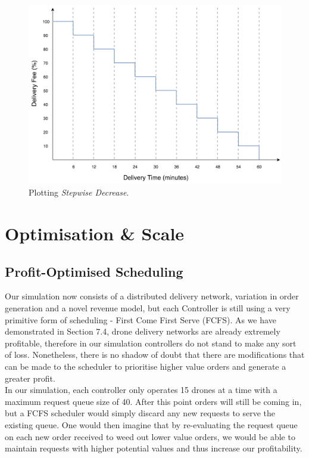 \documentclass[a4paper,11pt,titlepage]{report}
\begin{document}
\begin{figure}[!hbpt]
  \center
  \includegraphics[width=\linewidth]{img/tvfs_decrease.png}
  \caption{Plotting \textit{Stepwise Decrease}.}
  \label{fig:tvfs_decrease}
\end{figure}

\newpage
\part{Optimisation \& Scale}
\chapter{Profit-Optimised Scheduling}
Our simulation now consists of a distributed delivery network, variation in order generation and a novel revenue model, but each Controller is still using a very primitive form of scheduling - First Come First Serve (FCFS). As we have demonstrated in Section 7.4, drone delivery networks are already extremely profitable, therefore in our simulation controllers do not stand to make any sort of loss. Nonetheless, there is no shadow of doubt that there are modifications that can be made to the scheduler to prioritise higher value orders and generate a greater profit.\\

In our simulation, each controller only operates 15 drones at a time with a maximum request queue size of 40. After this point orders will still be coming in, but a FCFS scheduler would simply discard any new requests to serve the existing queue. One would then imagine that by re-evaluating the request queue on each new order received to weed out lower value orders, we would be able to maintain requests with higher potential values and thus increase our profitability.\\
\end{document}
